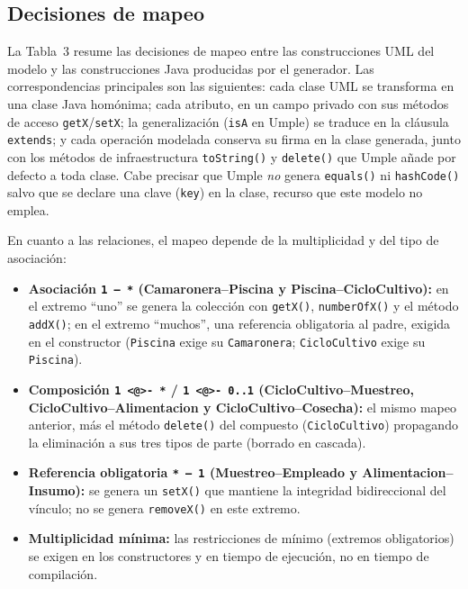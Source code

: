 \documentclass[11pt,a4paper]{article}
\begin{document}
\subsection{Decisiones de mapeo}

La Tabla~3 resume las decisiones de mapeo entre las construcciones UML
del modelo y las construcciones Java producidas por el generador. Las
correspondencias principales son las siguientes: cada clase UML se
transforma en una clase Java homónima; cada atributo, en un campo
privado con sus métodos de acceso \texttt{getX}/\texttt{setX}; la
generalización (\texttt{isA} en Umple) se traduce en la cláusula
\texttt{extends}; y cada operación modelada conserva su firma en la
clase generada, junto con los métodos de infraestructura
\texttt{toString()} y \texttt{delete()} que Umple añade por defecto a
toda clase. Cabe precisar que Umple \emph{no} genera \texttt{equals()}
ni \texttt{hashCode()} salvo que se declare una clave (\texttt{key})
en la clase, recurso que este modelo no emplea.

En cuanto a las relaciones, el mapeo depende de la multiplicidad y del
tipo de asociación:

\begin{itemize}
  \item \textbf{Asociación \texttt{1 -- *} (Camaronera--Piscina y
        Piscina--CicloCultivo):} en el extremo ``uno'' se genera la
        colección con \texttt{getX()}, \texttt{numberOfX()} y el
        método \texttt{addX()}; en el extremo ``muchos'', una
        referencia obligatoria al padre, exigida en el constructor
        (\texttt{Piscina} exige su \texttt{Camaronera};
        \texttt{CicloCultivo} exige su \texttt{Piscina}).
  \item \textbf{Composición \texttt{1 <@>- *} / \texttt{1 <@>- 0..1}
        (CicloCultivo--Muestreo, CicloCultivo--Alimentacion y
        CicloCultivo--Cosecha):} el mismo mapeo anterior, más el
        método \texttt{delete()} del compuesto (\texttt{CicloCultivo})
        propagando la eliminación a sus tres tipos de parte (borrado
        en cascada).
  \item \textbf{Referencia obligatoria \texttt{* -- 1} (Muestreo--Empleado
        y Alimentacion--Insumo):} se genera un \texttt{setX()} que
        mantiene la integridad bidireccional del vínculo; no se genera
        \texttt{removeX()} en este extremo.
  \item \textbf{Multiplicidad mínima:} las restricciones de mínimo
        (extremos obligatorios) se exigen en los constructores y en
        tiempo de ejecución, no en tiempo de compilación.
\end{itemize}
\end{document}
